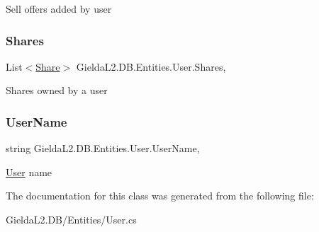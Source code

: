 Sell offers added by user 

\mbox{\label{class_gielda_l2_1_1_d_b_1_1_entities_1_1_user_a0758d1665b5e2851e9ce7251e4bae275}} 
\subsubsection{\texorpdfstring{Shares}{Shares}}
{\footnotesize\ttfamily List$<$\mbox{\hyperlink{class_gielda_l2_1_1_d_b_1_1_entities_1_1_share}{Share}}$>$ Gielda\+L2.\+D\+B.\+Entities.\+User.\+Shares\hspace{0.3cm}{\ttfamily [get]}, {\ttfamily [set]}}



Shares owned by a user 

\mbox{\label{class_gielda_l2_1_1_d_b_1_1_entities_1_1_user_adecd1c4376681df4136502e15d5a921c}} 
\subsubsection{\texorpdfstring{UserName}{UserName}}
{\footnotesize\ttfamily string Gielda\+L2.\+D\+B.\+Entities.\+User.\+User\+Name\hspace{0.3cm}{\ttfamily [get]}, {\ttfamily [set]}}



\mbox{\hyperlink{class_gielda_l2_1_1_d_b_1_1_entities_1_1_user}{User}} name 



The documentation for this class was generated from the following file\+:\begin{DoxyCompactItemize}
\item 
Gielda\+L2.\+D\+B/\+Entities/User.\+cs\end{DoxyCompactItemize}
